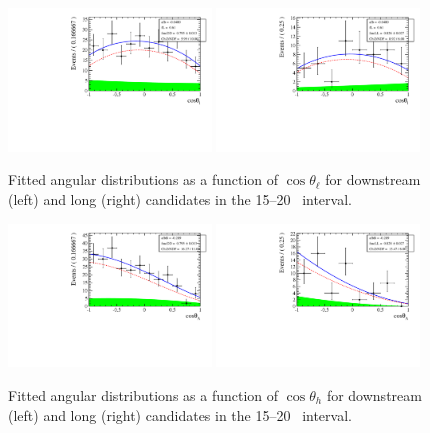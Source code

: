 \begin{figure}[h]
\centering
\includegraphics[width=0.48\textwidth]{Lmumu/figs/AngularDistribs/Fitted/Afb_DD_q2_1500_2000.pdf}
\includegraphics[width=0.48\textwidth]{Lmumu/figs/AngularDistribs/Fitted/Afb_LL_q2_1500_2000.pdf}
\caption{Fitted angular distributions as a function of $\cos\theta_\ell$ for downstream
 (left) and long (right) candidates in the 15--20 \gevgevcccc ~\qsq interval.  }
\label{fig:AngFit}
\end{figure}

\begin{figure}[h]
\centering
\includegraphics[width=0.48\textwidth]{Lmumu/figs/AngularDistribs/Fitted/AfbB_DD_q2_1500_2000.pdf}
\includegraphics[width=0.48\textwidth]{Lmumu/figs/AngularDistribs/Fitted/AfbB_LL_q2_1500_2000.pdf}
\caption{Fitted angular distributions as a function of $\cos\theta_h$ for downstream
 (left) and long (right) candidates in the 15--20 \gevgevcccc ~\qsq interval.  }
\end{figure}



